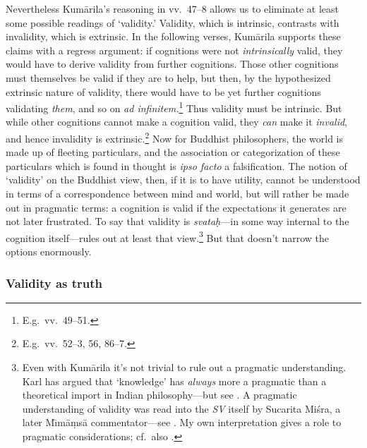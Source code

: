 \documentclass[11pt,letterpaper,oneside]{amsart}
\newcommand{\e}{\emph}
\newcommand{\kum}{Kum\={a}rila}
\newcommand{\sva}{\e{svata\d{h}}}
\begin{document}
Nevertheless \kum's reasoning in vv.\ 47--8 allows us to eliminate at least some possible readings of `validity.' Validity, which is intrinsic, contrasts with invalidity, which is extrinsic. In the following verses, Kum\=arila supports these claims with a regress argument: if cognitions were not \emph{intrinsically} valid, they would have to derive validity from further cognitions. Those other cognitions must themselves be valid if they are to help, but then, by the hypothesized extrinsic nature of validity, there would have to be yet further cognitions validating \emph{them}, and so on \emph{ad infinitem.}\footnote{E.g.\ vv.\ 49--51.} Thus validity must be intrinsic. But while other cognitions cannot make a cognition valid, they \emph{can} make it \emph{invalid}, and hence invalidity is extrinsic.\footnote{E.g.\ vv.\ 52--3, 56, 86--7.} Now for Buddhist philosophers, the world is made up of fleeting particulars, and the association or categorization of these particulars which is found in thought is \emph{ipso facto} a falsification. The notion of `validity' on the Buddhist view, then, if it is to have utility, cannot be understood in terms of a correspondence between mind and world, but will rather be made out in pragmatic terms: a cognition is valid if the expectations it generates are not later frustrated. To say that validity is \sva---in some way internal to the cognition itself---rules out at least that view.\footnote{Even with Kum\=arila it's not trivial to rule out a pragmatic understanding. Karl \citet{potter1984die, potter1992presuppositions} has argued that `knowledge' has \emph{always} more a pragmatic than a theoretical import in Indian philosophy---but see \citet{mohanty1984pramanya}. A pragmatic understanding of validity was read into the \emph{SV} itself by Sucarita Mi\'sra, a later M\={\i}m\=a\d ms\=a commentator---see \citet[p.\ 52--3]{chatterjea2003svatah}. My own interpretation gives a role to pragmatic considerations; cf.\ also \citet[pp.\ XX]{bhatt1962epistemology}.} But that doesn't narrow the options enormously.

\subsubsection*{Validity as truth}
\end{document}
